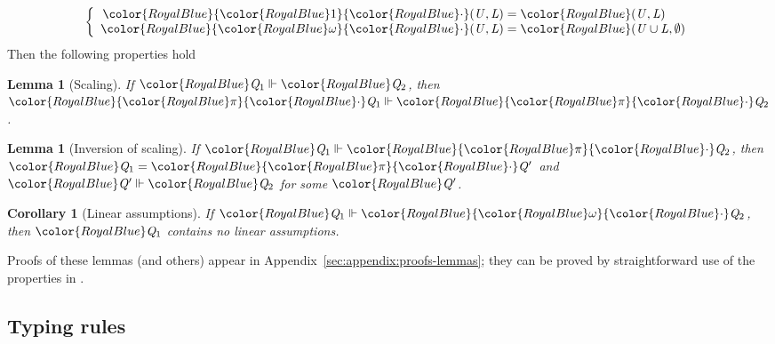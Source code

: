 \documentclass[acmsmall,usenames,dvipsnames,natbib=false,acmthm=false,screen]{acmart}
\newcommand{\constraintcolour}{\color{RoyalBlue}}
\newcommand{\constraintfont}[1]{{\constraintcolour#1}}
\newcommand{\multiplicitycolour}{\color{RoyalBlue}}
\newcommand{\multiplicityfont}[1]{{\multiplicitycolour#1}}
\newcommand{\scale}{\constraintfont{\cdot}}
\theoremstyle{acmplain}
\newtheorem{lemma}[theorem]{Lemma}
\newtheorem{corollary}[theorem]{Corollary}
\theoremstyle{acmdefinition}
\begin{document}
$$
                      \left\{
                      \begin{array}{r@{\;}c@{\;}l}
                          \constraintfont{   \multiplicityfont{ \ottsym{1} }  \scale \ottsym{(}  \ottnt{U}  \ottsym{,}  \ottnt{L}  \ottsym{)}  }   &=&   \constraintfont{ \ottsym{(}  \ottnt{U}  \ottsym{,}  \ottnt{L}  \ottsym{)} }   \\
                          \constraintfont{   \multiplicityfont{ \omega }  \scale \ottsym{(}  \ottnt{U}  \ottsym{,}  \ottnt{L}  \ottsym{)}  }   &=&   \constraintfont{ \ottsym{(}   \ottnt{U}  \cup  \ottnt{L}   \ottsym{,}  \emptyset  \ottsym{)} }  
                      \end{array}
                                                    \right.
$$
%
Then the following properties hold
%
\begin{lemma}[Scaling]
  \label{lem:q:scaling}
  If $ \constraintfont{ \ottnt{Q_{{\mathrm{1}}}} }   \Vdash   \constraintfont{ \ottnt{Q_{{\mathrm{2}}}} } $, then $ \constraintfont{   \multiplicityfont{ \pi }  \scale \ottnt{Q_{{\mathrm{1}}}}  }   \Vdash   \constraintfont{   \multiplicityfont{ \pi }  \scale \ottnt{Q_{{\mathrm{2}}}}  } $.
\end{lemma}

\begin{lemma}[Inversion of scaling]
  \label{lem:q:scaling-inversion}
  If $ \constraintfont{ \ottnt{Q_{{\mathrm{1}}}} }   \Vdash   \constraintfont{   \multiplicityfont{ \pi }  \scale \ottnt{Q_{{\mathrm{2}}}}  } $, then $  \constraintfont{ \ottnt{Q_{{\mathrm{1}}}} }  =  \constraintfont{   \multiplicityfont{ \pi }  \scale \ottnt{Q'}  }  $ and $ \constraintfont{ \ottnt{Q'} }   \Vdash   \constraintfont{ \ottnt{Q_{{\mathrm{2}}}} } $ for some $  \constraintfont{ \ottnt{Q'} }  $.
\end{lemma}

\begin{corollary}[Linear assumptions]
If $ \constraintfont{ \ottnt{Q_{{\mathrm{1}}}} }   \Vdash   \constraintfont{   \multiplicityfont{ \omega }  \scale \ottnt{Q_{{\mathrm{2}}}}  } $, then $  \constraintfont{ \ottnt{Q_{{\mathrm{1}}}} }  $ contains no linear assumptions.
\end{corollary}

Proofs of these lemmas (and others) appear in Appendix~\ref{sec:appendix:proofs-lemmas};
they can be proved by straightforward use of the properties in .

\subsection{Typing rules}
\label{sec:typing-rules}
\end{document}
